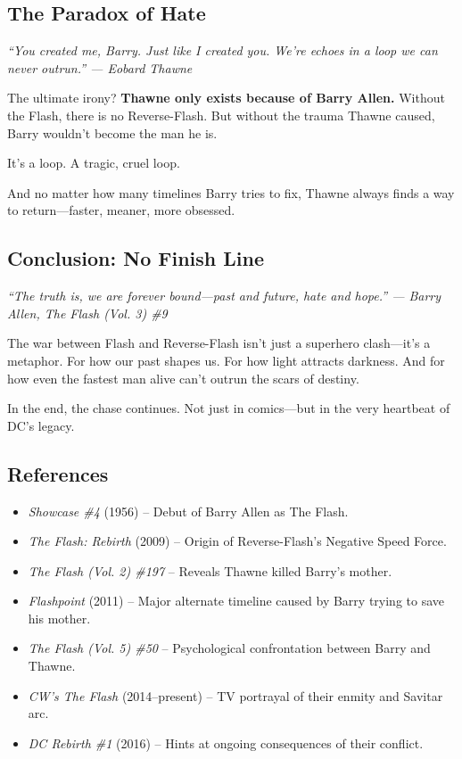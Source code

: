 \documentclass[a4paper,10pt,twocolumn]{memoir}
\newenvironment{magquote}
  {\begin{shaded*}\itshape\small}
  {\end{shaded*}}
\begin{document}
\subsection*{The Paradox of Hate}
\begin{magquote}
“You created me, Barry. Just like I created you. We’re echoes in a loop we can never outrun.”  
\hfill --- Eobard Thawne
\end{magquote}

The ultimate irony? \textbf{Thawne only exists because of Barry Allen.} Without the Flash, there is no Reverse-Flash. But without the trauma Thawne caused, Barry wouldn’t become the man he is.

It’s a loop. A tragic, cruel loop.

And no matter how many timelines Barry tries to fix, Thawne always finds a way to return---faster, meaner, more obsessed.

\subsection*{Conclusion: No Finish Line}
\begin{magquote}
“The truth is, we are forever bound---past and future, hate and hope.”  
\hfill --- Barry Allen, \textit{The Flash (Vol. 3) \#9}
\end{magquote}

The war between Flash and Reverse-Flash isn’t just a superhero clash---it’s a metaphor. For how our past shapes us. For how light attracts darkness. And for how even the fastest man alive can’t outrun the scars of destiny.

In the end, the chase continues. Not just in comics---but in the very heartbeat of DC’s legacy.

\subsection*{References}
\begin{itemize}
  \item \textit{Showcase \#4} (1956) – Debut of Barry Allen as The Flash.
  \item \textit{The Flash: Rebirth} (2009) – Origin of Reverse-Flash's Negative Speed Force.
  \item \textit{The Flash (Vol. 2) \#197} – Reveals Thawne killed Barry’s mother.
  \item \textit{Flashpoint} (2011) – Major alternate timeline caused by Barry trying to save his mother.
  \item \textit{The Flash (Vol. 5) \#50} – Psychological confrontation between Barry and Thawne.
  \item \textit{CW's The Flash} (2014–present) – TV portrayal of their enmity and Savitar arc.
  \item \textit{DC Rebirth \#1} (2016) – Hints at ongoing consequences of their conflict.
\end{itemize}
\clearpage
\end{document}
